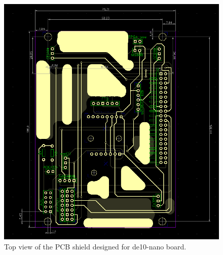 \begin{figure}[!htb]
    \centering
    \includegraphics[width=\textwidth]{Figures/hardware/PCB_diptrace.PNG}
    \caption{Top view of the PCB shield designed for de10-nano board.}
    \label{fig:pcb}
\end{figure}
